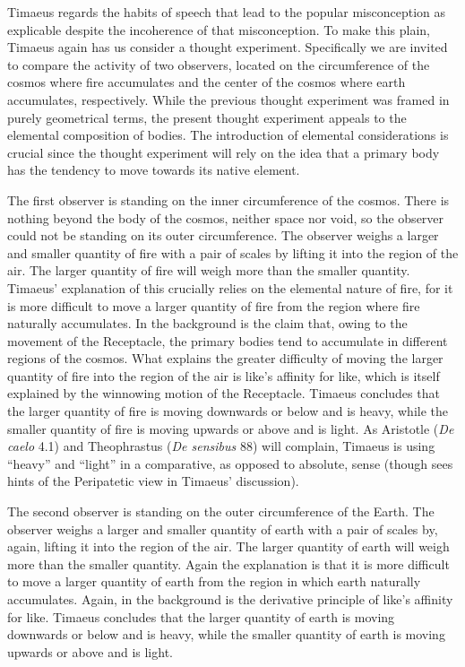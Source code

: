 Timaeus regards the habits of speech that lead to the popular misconception as explicable despite the incoherence of that misconception. To make this plain, Timaeus again has us consider a thought experiment. Specifically we are invited to compare the activity of two observers, located on the circumference of the cosmos where fire accumulates and the center of the cosmos where earth accumulates, respectively. While the previous thought experiment was framed in purely geometrical terms, the present thought experiment appeals to the elemental composition of bodies. The introduction of elemental considerations is crucial since the thought experiment will rely on the idea that a primary body has the tendency to move towards its native element.

The first observer is standing on the inner circumference of the cosmos. There is nothing beyond the body of the cosmos, neither space nor void, so the observer could not be standing on its outer circumference. The observer weighs a larger and smaller quantity of fire with a pair of scales by lifting it into the region of the air. The larger quantity of fire will weigh more than the smaller quantity. Timaeus' explanation of this crucially relies on the elemental nature of fire, for it is more difficult to move a larger quantity of fire from the region where fire naturally accumulates. In the background is the claim that, owing to the movement of the Receptacle, the primary bodies tend to accumulate in different regions of the cosmos. What explains the greater difficulty of moving the larger quantity of fire into the region of the air is like's affinity for like, which is itself explained by the winnowing motion of the Receptacle. Timaeus concludes that the larger quantity of fire is moving downwards or below and is heavy, while the smaller quantity of fire is moving upwards or above and is light. As Aristotle (\emph{De caelo} 4.1) and Theophrastus (\emph{De sensibus} 88) will complain, Timaeus is using ``heavy'' and ``light'' in a comparative, as opposed to absolute, sense (though \citealt{OBrien:1984ji} sees hints of the Peripatetic view in Timaeus' discussion).

The second observer is standing on the outer circumference of the Earth. The observer weighs a larger and smaller quantity of earth with a pair of scales by, again, lifting it into the region of the air. The larger quantity of earth will weigh more than the smaller quantity. Again the explanation is that it is more difficult to move a larger quantity of earth from the region in which earth naturally accumulates. Again, in the background is the derivative principle of like's affinity for like. Timaeus concludes that the larger quantity of earth is moving downwards or below and is heavy, while the smaller quantity of earth is moving upwards or above and is light.

